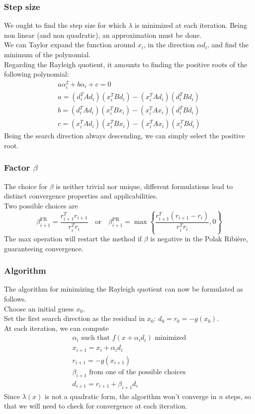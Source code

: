 \documentclass{article}
\begin{document}
\subsubsection{Step size}
We ought to find the step size for which $\lambda$ is minimized at each iteration. Being non linear (and non quadratic), an approximation must be done.
\\We can Taylor expand the function around $x_i$, in the direction $\alpha d_i$, and find the minimum of the polynomial.
\\Regarding the Rayleigh quotient, it amounts to finding the positive roots of the following polynomial:
\begin{gather*}
a \alpha_i^2 + b \alpha_i + c = 0 \\
a = (d_i^T A d_i) (x_i^T B d_i) - (x_i^T A d_i) (d_i^T B d_i) \\
b = (d_i^T A d_i) (x_i^T B x_i) - (x_i^T A x_i) (d_i^T B d_i) \\
c = (x_i^T A d_i) (x_i^T B x_i) - (x_i^T A x_i) (x_i^T B d_i)
\end{gather*}
Being the search direction always descending, we can simply select the positive root.
\subsubsection{Factor $\beta$}
The choice for $\beta$ is neither trivial nor unique, different formulations lead to distinct convergence properties and applicabilities.
\\Two possible choices are
\begin{equation}
\beta_{i+1}^{\text{FR}} = \frac{r_{i+1}^T r_{i+1}}{r_i^T r_i} 
\quad \text{or} \quad 
\beta_{i+1}^{\text{PR}} = \max \left\{ \frac{r_{i+1}^T (r_{i+1} - r_i)}{r_i^T r_i}, 0 \right\}
\end{equation}
The max operation will restart the method if $\beta$ is negative in the Polak Ribière, guaranteeing convergence.
\subsubsection{Algorithm}
The algorithm for minimizing the Rayleigh quotient can now be formulated as follows.
\\Choose an initial guess $x_0$.
\\Set the first search direction as the residual in $x_0$: $d_0 = r_0 = -g(x_0)$.
\\At each iteration, we can compute
\begin{align*}
    \alpha_i \text{ such that } f(x+\alpha_i d_i) \text{ minimized}
    \\x_{i+1} = x_i + \alpha_i d_i
    \\r_{i+1} = - g(x_{i+1})
    \\\beta_{i+1} \text{ from one of the possible choices}
    \\d_{i+1} = r_{i+1} + \beta_{i+1} d_i
\end{align*}
Since $\lambda(x)$ is not a quadratic form, the algorithm won't converge in $n$ steps, so that we will need to check for convergence at each iteration.
\end{document}
